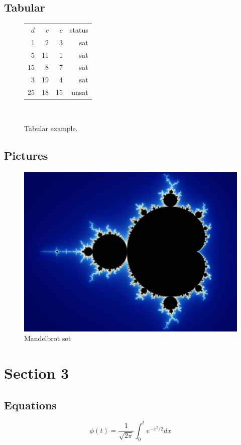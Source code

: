 \documentclass[a4paper,12pt,hidelinks]{article}
\begin{document}
	\subsection{Tabular}
	\begin{figure}[H]
		\begin{tabular}{ | r | r | r | r | }
			$d$ & $c$ & $e$ & status\\
			1 & 2 & 3 & sat \\
			5 & 11 & 1 & sat \\
			15 & 8 & 7 & sat \\
			3 & 19 & 4 & sat \\
			25 & 18 & 15 & unsat \\
		\end{tabular} \\
		\caption{Tabular example.}
		\label{tab:tab1}
	\end{figure}

	\lipsum[1]

	\subsection{Pictures}
	\begin{figure}[H]
		\centering
		\includegraphics[width=12cm]{figs/mandelbrotset.jpg}
		\caption{Mandelbrot set}
		\label{fig:mandelbrotset}
	\end{figure} 

	\pagebreak

\section{Section 3}
	\subsection{Equations}
	\begin{equation}
		\phi(t)=\frac{1}{\sqrt{2\pi}}
		\int^t_0 e^{-x^2/2} dx 
	\end{equation}
\end{document}
